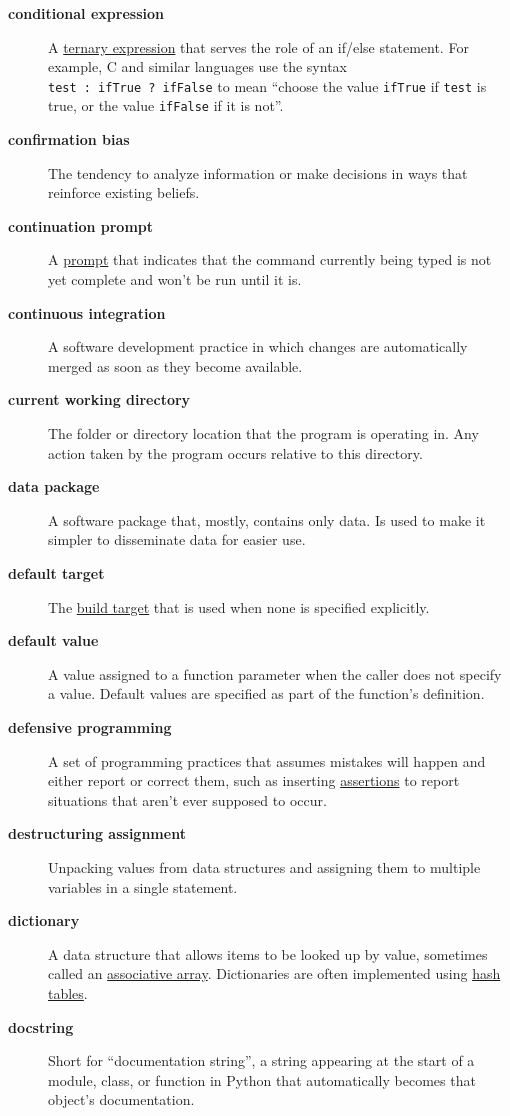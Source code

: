 \documentclass[
]{krantz}
\begin{document}
\begin{description}
\item[\textbf{conditional expression}]
A \protect\hyperlink{ternary_expression}{ternary expression} that serves the role of an if/else statement. For example, C and similar languages use the syntax \texttt{test\ :\ ifTrue\ ?\ ifFalse} to mean ``choose the value \texttt{ifTrue} if \texttt{test} is true, or the value \texttt{ifFalse} if it is not''.
\item[\textbf{confirmation bias}]
The tendency to analyze information or make decisions in ways that reinforce existing beliefs.
\item[\textbf{continuation prompt}]
A \protect\hyperlink{prompt}{prompt} that indicates that the command currently being typed is not yet complete and won't be run until it is.
\item[\textbf{continuous integration}]
A software development practice in which changes are automatically merged as soon as they become available.
\item[\textbf{current working directory}]
The folder or directory location that the program is operating in. Any action taken by the program occurs relative to this directory.
\item[\textbf{data package}]
A software package that, mostly, contains only data. Is used to make it simpler to disseminate data for easier use.
\item[\textbf{default target}]
The \protect\hyperlink{build_target}{build target} that is used when none is specified explicitly.
\item[\textbf{default value}]
A value assigned to a function parameter when the caller does not specify a value. Default values are specified as part of the function's definition.
\item[\textbf{defensive programming}]
A set of programming practices that assumes mistakes will happen and either report or correct them, such as inserting \protect\hyperlink{assertion}{assertions} to report situations that aren't ever supposed to occur.
\item[\textbf{destructuring assignment}]
Unpacking values from data structures and assigning them to multiple variables in a single statement.
\item[\textbf{dictionary}]
A data structure that allows items to be looked up by value, sometimes called an \protect\hyperlink{associative_array}{associative array}. Dictionaries are often implemented using \protect\hyperlink{hash_table}{hash tables}.
\item[\textbf{docstring}]
Short for ``documentation string'', a string appearing at the start of a module, class, or function in Python that automatically becomes that object's documentation.

\end{description}
\end{document}
